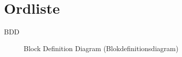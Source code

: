 \chapter{Ordliste}


\begin{description}

\item[BDD] Block Definition Diagram (Blokdefinitionsdiagram)

\end{description}